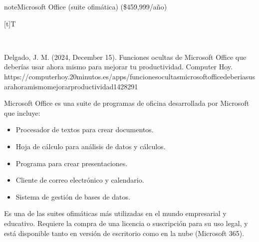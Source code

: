 \documentclass[letterpaper,10pt,spanish]{sphinxmanual}
\let\sphinxpxdimen\pdfpxdimen\else\newdimen\sphinxpxdimen
\begin{document}
\begin{sphinxadmonition}{note}{Microsoft Office (suite ofimática) (\$459,999/año)}


\begin{savenotes}\sphinxattablestart
\sphinxthistablewithglobalstyle
\centering
\begin{tabulary}{\linewidth}[t]{T}
\sphinxtoprule
\sphinxtableatstartofbodyhook

\begin{sphinxfigure-in-table}
\centering
\capstart
\noindent\sphinxincludegraphics[width=300\sphinxpxdimen]{{image102}.png}
\label{\detokenize{1_guias/10ofimatica/G1012:id50}}\end{sphinxfigure-in-table}\relax
\\
\sphinxbottomrule
\end{tabulary}
\sphinxtableafterendhook\par
\sphinxattableend\end{savenotes}

\sphinxAtStartPar
%
\begin{footnote}[12]\sphinxAtStartFootnote
Delgado, J. M. (2024, December 15). Funciones ocultas de Microsoft Office que deberías usar ahora mismo para mejorar tu productividad. Computer Hoy. https://computerhoy.20minutos.es/apps/funciones\sphinxhyphen{}ocultas\sphinxhyphen{}microsoft\sphinxhyphen{}office\sphinxhyphen{}deberias\sphinxhyphen{}usar\sphinxhyphen{}ahora\sphinxhyphen{}mismo\sphinxhyphen{}mejorar\sphinxhyphen{}productividad\sphinxhyphen{}1428291
%
\end{footnote} Microsoft Office es una suite de programas de oficina desarrollada por Microsoft que incluye:
\begin{itemize}
\item {} 
\sphinxAtStartPar
{} Procesador de textos para crear documentos.

\item {} 
\sphinxAtStartPar
{} Hoja de cálculo para análisis de datos y cálculos.

\item {} 
\sphinxAtStartPar
{} Programa para crear presentaciones.

\item {} 
\sphinxAtStartPar
{} Cliente de correo electrónico y calendario.

\item {} 
\sphinxAtStartPar
{} Sistema de gestión de bases de datos.

\end{itemize}

\sphinxAtStartPar
Es una de las suites ofimáticas más utilizadas en el mundo empresarial y educativo. Requiere la compra de una licencia o suscripción para su uso legal, y está disponible tanto en versión de escritorio como en la nube (Microsoft 365).
\end{sphinxadmonition}
\end{document}
